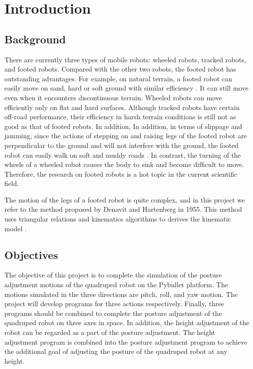 \chapter{Introduction}

\section{Background}

There are currently three types of mobile robots: wheeled robots, tracked robots, and footed robots. Compared with the other two robots, the footed robot has outstanding advantages. For example, on natural terrain, a footed robot can easily move on sand, hard or soft ground with similar efficiency \cite{ref:Quadrupedal_locomotion}. It can still move even when it encounters discontinuous terrain. Wheeled robots can move efficiently only on flat and hard surfaces. Although tracked robots have certain off-road performance, their efficiency in harsh terrain conditions is still not as good as that of footed robots. In addition, In addition, in terms of slippage and jamming, since the actions of stepping on and raising legs of the footed robot are perpendicular to the ground and will not interfere with the ground, the footed robot can easily walk on soft and muddy roads \cite{ref:Quadrupedal_locomotion}. In contrast, the turning of the wheels of a wheeled robot causes the body to sink and become difficult to move. Therefore, the research on footed robots is a hot topic in the current scientific field.

The motion of the legs of a footed robot is quite complex, and in this project we refer to the method proposed by Denavit and Hartenberg in 1955. This method uses triangular relations and kinematics algorithms to derives the kinematic model \cite{ref:Quadrupedal_locomotion}.

\section{Objectives}

The objective of this project is to complete the simulation of the posture adjustment motions of the quadruped robot on the Pybullet platform. The motions simulated in the three directions are pitch, roll, and yaw motion. The project will develop programs for three actions respectively. Finally, three programs should be combined to complete the posture adjustment of the quadruped robot on three axes in space. In addition, the height adjustment of the robot can be regarded as a part of the posture adjustment. The height adjustment program is combined into the posture adjustment program to achieve the additional goal of adjusting the posture of the quadruped robot at any height.

